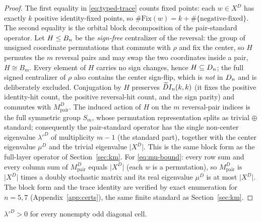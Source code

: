 \begin{proof}
The first equality in \eqref{eq:typed-trace} counts fixed points: each $w\in X^{D}$ has exactly $k$ positive
identity-fixed points, so $\#\mathrm{Fix}(w)=k+\#\{\text{negative-fixed}\}$.  The second equality is the orbital block
decomposition of the pair-standard operator.  Let $H\le B_n$ be the \emph{sign-free} centralizer of the reversal: the
group of unsigned coordinate permutations that commute with $\rho$ and fix the center, so $H$ permutes the $m$
reversal pairs and may swap the two coordinates inside a pair, $H\cong B_m$.  Every element of $H$ carries no sign
changes, hence $H\subseteq D_n$; the full signed centralizer of $\rho$ also contains the center sign-flip, which is
\emph{not} in $D_n$ and is deliberately excluded.  Conjugation by $H$ preserves $\widetilde{D}I_n(k,k)$ (it fixes the
positive identity-hit count, the positive reversal-hit count, and the sign parity) and commutes with
$M^{D}_{\mathrm{pair}}$.  The induced action of $H$ on the $m$ reversal-pair indices is the full symmetric group $S_m$,
whose permutation representation splits as trivial $\oplus$ standard; consequently the pair-standard operator has the
single non-center eigenvalue $\lambda'^{D}$ of multiplicity $m-1$ (the standard part), together with the center
eigenvalue $\mu^{D}$ and the trivial eigenvalue $\lvert X^{D}\rvert$.  This is the same block form as the full-layer
operator of Section~\ref{sec:km}.  For \eqref{eq:mu-bound}: every row sum and every column sum of
$M^{D}_{\mathrm{pair}}$ equals $\lvert X^{D}\rvert$ (each $w$ is a permutation), so $M^{D}_{\mathrm{pair}}$ is
$\lvert X^{D}\rvert$ times a doubly stochastic matrix and its real eigenvalue $\mu^{D}$ is at most
$\lvert X^{D}\rvert$.  The block form and the trace identity are verified by exact enumeration for $n=5,7$
(Appendix~\ref{app:certs}), the same finite standard as Section~\ref{sec:km}.
\end{proof}

\begin{proposition}\label{prop:typedpair}
$\lambda'^{D}>0$ for every nonempty odd diagonal cell.
\end{proposition}

